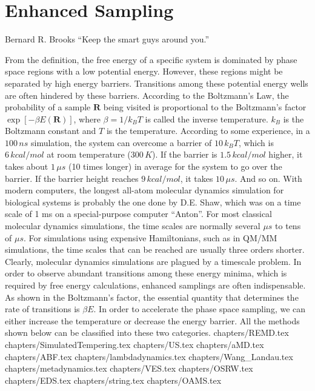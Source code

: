 \chapter{Enhanced Sampling\label{chapter:ES}}
\begin{chapquote}{Bernard R. Brooks%
	}
	``Keep the smart guys around you.''
\end{chapquote}
From the definition, the free energy of a specific system is dominated by phase space regions with a low potential energy. However, these regions might be separated by high energy barriers. Transitions among these potential energy wells are often hindered by these barriers. According to the Boltzmann's Law, the probability of a sample $\mathbf{R}$ being visited is proportional to the Boltzmann's factor $\exp{\left[-\beta E(\mathbf{R})\right]}$, where $\beta=1/k_BT$ is called the inverse temperature. $k_B$ is the Boltzmann constant and $T$ is the temperature. According to some experience, in a $100\, ns$ simulation, the system can overcome a barrier of $10\, k_BT$, which is $6\, kcal/mol$ at room temperature ($300\, K$). If the barrier is $1.5\, kcal/mol$ higher, it takes about $1\, \mu s$ (10 times longer) in average for the system to go over the barrier. If the barrier height reaches $9\, kcal/mol$, it takes $10\,\mu s$. And so on. With modern computers, the longest all-atom molecular dynamics simulation for biological systems is probably the one done by D.E. Shaw, which was on a time scale of 1 ms on a special-purpose computer ``Anton''. For most classical molecular dynamics simulations, the time scales are normally several $\mu s$ to tens of $\mu s$. For simulations using expensive Hamiltonians, such as in QM/MM simulations, the time scales that can be reached are usually three orders shorter. Clearly, molecular dynamics simulations are plagued by a timescale problem. In order to observe abundant transitions among these energy minima, which is required by free energy calculations, enhanced samplings are often indispensable. As shown in the Boltzmann's factor, the essential quantity that determines the rate of transitions is $\beta E$. In order to accelerate the phase space sampling, we can either increase the temperature or decrease the energy barrier. All the methods shown below can be classified into these two categories. 
\clearpage 
 {chapters/REMD.tex}
\clearpage
 {chapters/SimulatedTempering.tex}
\clearpage 
 {chapters/US.tex}
\clearpage
 {chapters/aMD.tex}
\clearpage
 {chapters/ABF.tex}
\clearpage 
 {chapters/lambdadynamics.tex}
\clearpage 
 {chapters/Wang_Landau.tex}
\clearpage 
 {chapters/metadynamics.tex}
\clearpage 
 {chapters/VES.tex}
\clearpage 
 {chapters/OSRW.tex}
\clearpage
 {chapters/EDS.tex}
%
\clearpage
 {chapters/string.tex}
\clearpage
 {chapters/OAMS.tex}
